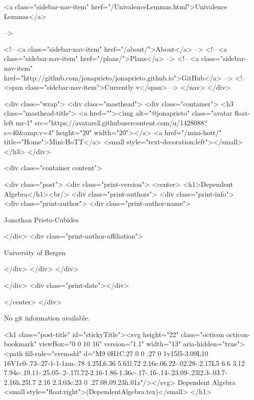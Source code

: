       
    
      
        
          <a class="sidebar-nav-item" href="/UnivalenceLemmas.html">Univalence Lemmas</a>
        
      
     -->

    <!-- <a class="sidebar-nav-item" href="/about/">About</a> -->
    <!-- <a class="sidebar-nav-item" href="/plans/">Plans</a> -->
    <!-- <a class="sidebar-nav-item" href="http://github.com/jonaprieto/jonaprieto.github.io">GitHub</a> -->
    <!-- <span class="sidebar-nav-item">Currently v</span> -->
  </nav>
</div>

    <div class="wrap">
      <div class="masthead">
        <div class="container">
          <h3 class="masthead-title">
            <a href=""><img alt="@jonaprieto" class="avatar float-left mr-1" src="https://avatars3.githubusercontent.com/u/1428088?s=40&amp;v=4" height="20" width="20"></a>
            <a href="/mini-hott/" title="Home">Mini-HoTT</a>
            <small style="text-decoration:left"></small>
          </h3>
        </div>
      
      <div class="container content">
        







<div class="post">
  <div class="print-version">
    <center>
      <h1>Dependent Algebra</h1><br/>
        <div class="print-authors">
          <div class="print-info">
            <div class="print-author">
              <div class="print-author-name">
                
                  Jonathan Prieto-Cubides
                
              </div>
              <div class="print-author-affiliation">
                
                  University of Bergen
                
                </div>
            </div>
          </div>
          
          
        </div>
        <div class="print-date"></div>
        
        
    </center>
  </div>

  
  No git information available.
  

  <h1 class="post-title" id="stickyTitle"><svg height="22" class="octicon octicon-bookmark" viewBox="0 0 10 16" version="1.1" width="13" aria-hidden="true"><path fill-rule="evenodd" d="M9 0H1C.27 0 0 .27 0 1v15l5-3.09L10 16V1c0-.73-.27-1-1-1zm-.78 4.25L6.36 5.61l.72 2.16c.06.22-.02.28-.2.17L5 6.6 3.12 7.94c-.19.11-.25.05-.2-.17l.72-2.16-1.86-1.36c-.17-.16-.14-.23.09-.23l2.3-.03.7-2.16h.25l.7 2.16 2.3.03c.23 0 .27.08.09.23h.01z"/></svg> Dependent Algebra <small style="float:right">(DependentAlgebra.tex)</small>
  </h1>

